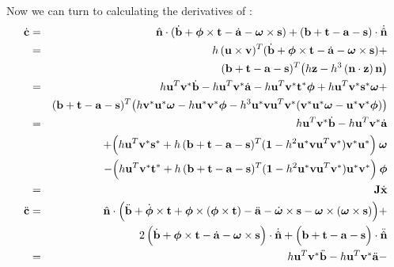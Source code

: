 Now we can turn to calculating the derivatives of :
\begin{eqnarray}
\dot{\ve{c}} &=& \hat{\ve{n}}\cdot(\dot{\ve{b}} + \ve{\phi}\times\ve{t} - \dot{\ve{a}} -
        \ve{\omega}\times\ve{s}) + (\ve{b}+\ve{t}-\ve{a}-\ve{s})\cdot\dot{\hat{\ve{n}}} \\*
    &=& h\,(\ve{u}\times\ve{v})^T (\dot{\ve{b}} + \ve{\phi}\times\ve{t} - \dot{\ve{a}} -
        \ve{\omega}\times\ve{s}) + \nonumber\\*&&
        (\ve{b}+\ve{t}-\ve{a}-\ve{s})^T \big( h\ve{z} - h^3\,(\ve{n}\cdot\ve{z})\,\ve{n} \big)
        \nonumber\\
    &=& h\ve{u}^T\dual{\ve{v}}\dot{\ve{b}} - h\ve{u}^T\dual{\ve{v}}\dot{\ve{a}} -
        h\ve{u}^T\dual{\ve{v}}\dual{\ve{t}}\ve{\phi} +
        h\ve{u}^T\dual{\ve{v}}\dual{\ve{s}}\ve{\omega} + \nonumber\\*&&
        (\ve{b}+\ve{t}-\ve{a}-\ve{s})^T
        \big(h\dual{\ve{v}}\dual{\ve{u}}\ve{\omega} - h\dual{\ve{u}}\dual{\ve{v}}\ve{\phi} -
        h^3\dual{\ve{u}}\ve{v}\ve{u}^T\dual{\ve{v}}
        (\dual{\ve{v}}\dual{\ve{u}}\ve{\omega} - \dual{\ve{u}}\dual{\ve{v}}\ve{\phi})\big)
        \nonumber\\
    &=& h\ve{u}^T\dual{\ve{v}}\dot{\ve{b}} - h\ve{u}^T\dual{\ve{v}}\dot{\ve{a}} \nonumber\\*&&
        +\Big( h\ve{u}^T\dual{\ve{v}}\dual{\ve{s}} + h\,(\ve{b}+\ve{t}-\ve{a}-\ve{s})^T
        (\m{1} - h^2 \dual{\ve{u}}\ve{v}\ve{u}^T\dual{\ve{v}}) \dual{\ve{v}}\dual{\ve{u}}
        \Big)\:\ve{\omega} \nonumber\\*&&
        -\Big( h\ve{u}^T\dual{\ve{v}}\dual{\ve{t}} + h\,(\ve{b}+\ve{t}-\ve{a}-\ve{s})^T
        (\m{1} - h^2 \dual{\ve{u}}\ve{v}\ve{u}^T\dual{\ve{v}}) \dual{\ve{u}}\dual{\ve{v}}
        \Big)\:\ve{\phi} \\*
    &=& \m{J}\dot{\ve{x}} \nonumber\\
\ddot{\ve{c}} &=& \hat{\ve{n}}\cdot\Big(\ddot{\ve{b}} + \dot{\ve{\phi}}\times\ve{t} +
        \ve{\phi}\times(\ve{\phi}\times\ve{t}) - \ddot{\ve{a}} - \dot{\ve{\omega}}\times\ve{s} -
        \ve{\omega}\times(\ve{\omega}\times\ve{s})\Big) + \nonumber\\*&&
        2\,\Big(\dot{\ve{b}} + \ve{\phi}\times\ve{t} - \dot{\ve{a}} - \ve{\omega}\times\ve{s}\Big)
        \cdot\dot{\hat{\ve{n}}} +
        \Big(\ve{b} + \ve{t} - \ve{a} - \ve{s}\Big)\cdot\ddot{\hat{\ve{n}}} \\
    &=& h\ve{u}^T\dual{\ve{v}}\ddot{\ve{b}} - h\ve{u}^T\dual{\ve{v}}\ddot{\ve{a}} -

\end{eqnarray}
